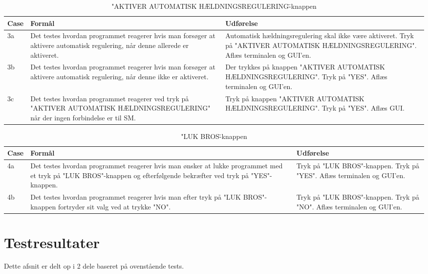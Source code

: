 \begin{table}[H]
\caption{"AKTIVER AUTOMATISK HÆLDNINGSREGULERING\"-knappen}
\centering
\begin{tabular}{| p{1.2cm}  | p{4.5cm} | p{8cm} |}
\hline
Case &Formål &Udførelse\\\hline
3a &Det testes hvordan programmet reagerer hvis man forsøger at aktivere automatisk regulering, når denne allerede er aktiveret. &Automatisk hældningsregulering skal ikke være aktiveret. Tryk på "AKTIVER AUTOMATISK HÆLDNINGSREGULERING". Aflæs terminalen og GUI'en.\\\hline

3b &Det testes hvordan programmet reagerer hvis man forsøger at aktivere automatisk regulering, når denne ikke er aktiveret. &Der trykkes på knappen "AKTIVER AUTOMATISK HÆLDNINGSREGULERING". Tryk på "YES". Aflæs terminalen og GUI'en.\\\hline

3c &Det testes hvordan programmet reagerer ved tryk på "AKTIVER AUTOMATISK HÆLDNINGSREGULERING" når der ingen forbindelse er til SM.&Tryk på knappen "AKTIVER AUTOMATISK HÆLDNINGSREGULERING". Tryk på "YES". Aflæs GUI.\\\hline
\end{tabular}
\end{table}

\begin{table}[H]
\caption{"LUK BROS\"-knappen}
\centering
\begin{tabular}{| p{1.2cm}  | p{4.5cm} | p{8cm} |}
\hline
Case &Formål &Udførelse\\\hline
4a &Det testes hvordan programmet reagerer hvis man ønsker at lukke programmet med et tryk på "LUK BROS"-knappen og efterfølgende bekræfter ved tryk på "YES"-knappen.&Tryk på "LUK BROS"-knappen. Tryk på "YES". Aflæs terminalen og GUI'en.\\\hline

4b &Det testes hvordan programmet reagerer hvis man efter tryk på "LUK BROS"-knappen fortryder sit valg ved at trykke "NO".&Tryk på "LUK BROS"-knappen. Tryk på "NO". Aflæs terminalen og GUI'en.\\\hline
\end{tabular}
\end{table}
\section{Testresultater}
Dette afsnit er delt op i  2 dele baseret på ovenstående tests.\\

